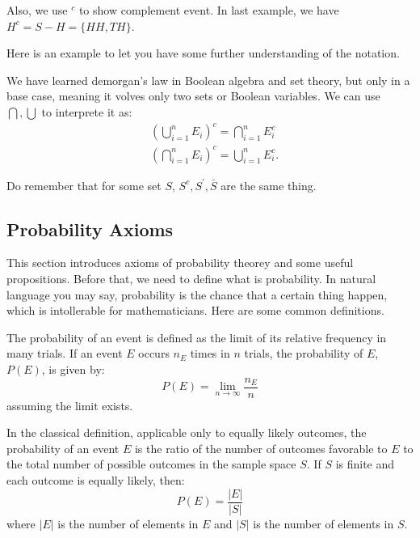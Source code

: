     Also, we use $^c$ to show complement event. In last example, we have $H^c = S-H = \{HH,TH\}$.

    Here is an example to let you have some further understanding of the notation.
    \begin{example}
        We have learned demorgan's law in Boolean algebra and set theory, but only in a base case, meaning 
        it volves only two sets or Boolean variables. We can use $\bigcap, \bigcup$ to interprete it
        as:
        \[\begin{aligned}&\left(\bigcup_{i=1}^nE_i\right)^c=\bigcap_{i=1}^nE_i^c\\&\left(\bigcap_{i=1}^nE_i\right)^c=\bigcup_{i=1}^nE_i^c.\end{aligned}\]
    \end{example}
    \begin{remark}
        Do remember that for some set $S$, $S^c, S^\prime,\bar{S}$ are the same thing.
    \end{remark}


    \subsection{Probability Axioms}
    This section introduces axioms of probability theorey and some useful propositions. Before that,
    we need to define what is probability. In natural language you may say, probability is the chance
    that a certain thing happen, which is intollerable for mathematicians. Here
    are some common definitions.
    
    \begin{definition}
    The probability of an event is defined as the limit of its relative frequency in many trials. If an event \( E \) occurs \( n_E \) times in \( n \) trials, the probability of \( E \), \( P(E) \), is given by:
    \[ P(E) = \lim_{n \to \infty} \frac{n_E}{n} \]
    assuming the limit exists.
    \end{definition}
    
    \begin{definition}
    In the classical definition, applicable only to equally likely outcomes, the probability of an event \( E \) is the ratio of the number of outcomes favorable to \( E \) to the total number of possible outcomes in the sample space \( S \). If \( S \) is finite and each outcome is equally likely, then:
    \[ P(E) = \frac{|E|}{|S|} \]
    where \( |E| \) is the number of elements in \( E \) and \( |S| \) is the number of elements in \( S \).
    \end{definition}
    
